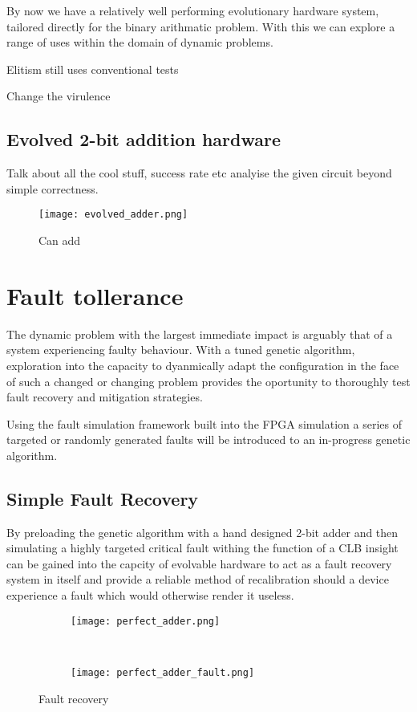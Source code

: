 By now we have a relatively well performing evolutionary hardware system,
tailored directly for the binary arithmatic problem. With this we can explore
a range of uses within the domain of dynamic problems.

Elitism still uses conventional tests

Change the virulence

\subsection{Evolved 2-bit addition hardware}
Talk about all the cool stuff, success rate etc analyise the given circuit
beyond simple correctness.

\begin{figure}
	\centering
	\texttt{[image: evolved\_adder.png]}
	\caption{Can add}
\end{figure}

\section{Fault tollerance}

The dynamic problem with the largest immediate impact is arguably that of
a system experiencing faulty behaviour.
With a tuned genetic algorithm, exploration into the capacity to dyanmically
adapt the configuration in the face of such a changed or changing problem provides
the oportunity to thoroughly test fault recovery and mitigation strategies.

Using the fault simulation framework built into the FPGA simulation a series
of targeted or randomly generated faults will be introduced to an in-progress
genetic algorithm.

\subsection{Simple Fault Recovery}
By preloading the genetic algorithm with a hand designed 2-bit adder and then
simulating a highly targeted critical fault withing the function of a CLB insight
can be gained into the capcity of evolvable hardware to act as a fault recovery
system in itself and provide a reliable method of recalibration should a device
experience a fault which would otherwise render it useless.

\begin{figure}
	\centering
	\begin{subfigure}[ht]{0.45\textwidth}
		\texttt{[image: perfect\_adder.png]}
	\end{subfigure}
	~
	\begin{subfigure}[ht]{0.45\textwidth}
		\texttt{[image: perfect\_adder\_fault.png]}
	\end{subfigure}
	\caption{Fault recovery}
\end{figure}

